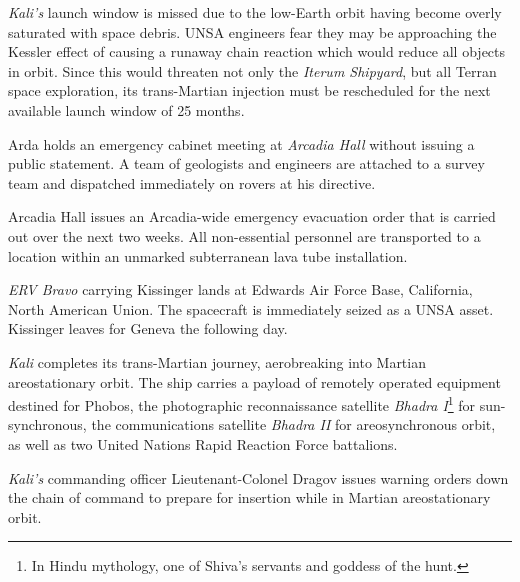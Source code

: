 {\it Kali's} launch window is missed due to the low-Earth orbit having become overly saturated with space debris. UNSA engineers fear they may be approaching the Kessler effect of causing a runaway chain reaction which would reduce all objects in orbit. Since this would threaten not only the {\it Iterum Shipyard}, but all Terran space exploration, its trans-Martian injection must be rescheduled for the next available launch window of 25 months.
\StopTimelineDate

Arda holds an emergency cabinet meeting at {\it Arcadia Hall} without issuing a public statement. A team of geologists and engineers are attached to a survey team and dispatched immediately on rovers at his directive.
\StopTimelineDate

Arcadia Hall issues an Arcadia-wide emergency evacuation order that is carried out over the next two weeks. All non-essential personnel are transported to a location within an unmarked subterranean lava tube installation.
\StopTimelineDate

{\it ERV Bravo} carrying Kissinger lands at Edwards Air Force Base, California, North American Union. The spacecraft is immediately seized as a UNSA asset. Kissinger leaves for Geneva the following day.
\StopTimelineDate

{\it Kali} completes its trans-Martian journey, aerobreaking into Martian areostationary orbit. The ship carries a payload of remotely operated equipment destined for Phobos, the photographic reconnaissance satellite {\it Bhadra I}\footnote{In Hindu mythology, one of Shiva's servants and goddess of the hunt.} for sun-synchronous, the communications satellite {\it Bhadra II} for areosynchronous orbit, as well as two United Nations Rapid Reaction Force battalions.
\StopTimelineDate

{\it Kali's} commanding officer Lieutenant-Colonel Dragov issues warning orders down the chain of command to prepare for insertion while in Martian areostationary orbit.
\StopTimelineDate

